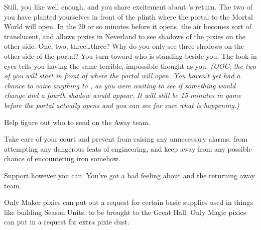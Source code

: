 \documentclass[char]{PP}
\begin{document}
Still, you like \cFButterfly{} well enough, and you share \cFButterfly{\their} excitement about \cFLost{}’s return. The two of you have planted yourselves in front of the plinth where the portal to the Mortal World will open. In the 20 or so minutes before it opens, the air becomes sort of translucent, and allows pixies in Neverland to see shadows of the pixies on the other side. One, two, three\ldots three? Why do you only see three shadows on the other side of the portal?  You turn toward \cFButterfly{} who is standing beside you. The look in \cFButterfly{\their} eyes tells you \cFButterfly{\they} \cFButterfly{\are} having the same terrible, impossible thought as you. \textit{(OOC: the two of you will start in front of where the portal will open. You haven’t yet had a chance to voice anything to \cFButterfly{}, as you were waiting to see if something would change and a fourth shadow would appear. It will still be 15 minutes in game before the portal actually opens and you can see for sure what is happening.)}

\begin{itemz}
	\item Help \cSHead{} figure out who to send on the Away team.
	\item Take care of your court and prevent \cMTree{} from raising any unnecessary alarms, \cMAirship{} from attempting any dangerous feats of engineering, and keep \cMIron{} away from any possible chance of encountering iron somehow.
	\item Support \cFButterfly{} however you can. You’ve got a bad feeling about \cFLost{} and the returning away team.
\end{itemz}

\begin{itemz}[Notes]
	\item Only Maker pixies can put out a request for certain basic supplies used in things like building Season Units. to be brought to the Great Hall. Only Magic pixies can put in a request for extra pixie dust.
\end{itemz}
\end{document}
